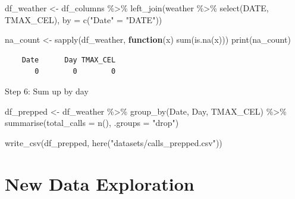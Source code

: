 \documentclass[
  letterpaper,
  DIV=11,
  numbers=noendperiod]{scrartcl}
\newenvironment{Shaded}{\begin{snugshade}}{\end{snugshade}}
\newcommand{\AttributeTok}[1]{\textcolor[rgb]{0.40,0.45,0.13}{#1}}
\newcommand{\ControlFlowTok}[1]{\textcolor[rgb]{0.00,0.23,0.31}{\textbf{#1}}}
\newcommand{\FunctionTok}[1]{\textcolor[rgb]{0.28,0.35,0.67}{#1}}
\newcommand{\NormalTok}[1]{\textcolor[rgb]{0.00,0.23,0.31}{#1}}
\newcommand{\OtherTok}[1]{\textcolor[rgb]{0.00,0.23,0.31}{#1}}
\newcommand{\SpecialCharTok}[1]{\textcolor[rgb]{0.37,0.37,0.37}{#1}}
\newcommand{\StringTok}[1]{\textcolor[rgb]{0.13,0.47,0.30}{#1}}
\begin{document}
\begin{Shaded}
\begin{Highlighting}[]
\NormalTok{df\_weather }\OtherTok{\textless{}{-}}\NormalTok{ df\_columns }\SpecialCharTok{\%\textgreater{}\%}
  \FunctionTok{left\_join}\NormalTok{(weather }\SpecialCharTok{\%\textgreater{}\%} \FunctionTok{select}\NormalTok{(DATE, TMAX\_CEL), }\AttributeTok{by =} \FunctionTok{c}\NormalTok{(}\StringTok{"Date"} \OtherTok{=} \StringTok{"DATE"}\NormalTok{))}
\end{Highlighting}
\end{Shaded}

\begin{Shaded}
\begin{Highlighting}[]
\NormalTok{na\_count }\OtherTok{\textless{}{-}} \FunctionTok{sapply}\NormalTok{(df\_weather, }\ControlFlowTok{function}\NormalTok{(x) }\FunctionTok{sum}\NormalTok{(}\FunctionTok{is.na}\NormalTok{(x)))}
\FunctionTok{print}\NormalTok{(na\_count)}
\end{Highlighting}
\end{Shaded}

\begin{verbatim}
    Date      Day TMAX_CEL 
       0        0        0 
\end{verbatim}

Step 6: Sum up by day

\begin{Shaded}
\begin{Highlighting}[]
\NormalTok{df\_prepped }\OtherTok{\textless{}{-}}\NormalTok{ df\_weather }\SpecialCharTok{\%\textgreater{}\%}
  \FunctionTok{group\_by}\NormalTok{(Date, Day, TMAX\_CEL) }\SpecialCharTok{\%\textgreater{}\%}
  \FunctionTok{summarise}\NormalTok{(}\AttributeTok{total\_calls =} \FunctionTok{n}\NormalTok{(), }\AttributeTok{.groups =} \StringTok{"drop"}\NormalTok{)}
\end{Highlighting}
\end{Shaded}

\begin{Shaded}
\begin{Highlighting}[]
\FunctionTok{write\_csv}\NormalTok{(df\_prepped, }\FunctionTok{here}\NormalTok{(}\StringTok{"datasets/calls\_prepped.csv"}\NormalTok{))}
\end{Highlighting}
\end{Shaded}

\section{New Data Exploration}\label{new-data-exploration}
\end{document}
